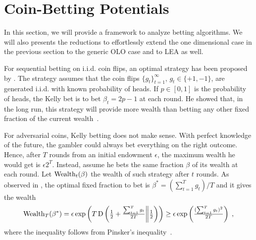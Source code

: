 \section{Coin-Betting Potentials}
\label{section:coin-betting-potentials}

In this section, we will provide a framework to analyze betting algorithms.  We
will also presents the reductions to effortlessly extend the one dimensional
case in the previous section to the generic \ac{OLO} case and to \ac{LEA} as
well.

For sequential betting on i.i.d. coin flips, an optimal strategy has been
proposed by \citet{Kelly-1956}.  The strategy assumes that the coin flips
$\{g_t\}_{t=1}^\infty$, $g_t \in \{+1,-1\}$, are generated i.i.d. with known
probability of heads. If $p \in [0,1]$ is the probability of heads, the Kelly
bet is to bet $\beta_t = 2p - 1$ at each round. He showed that, in the long
run, this strategy will provide more wealth than betting any other fixed
fraction of the current wealth~\cite{Kelly-1956}.

For adversarial coins, Kelly betting does not make sense. With perfect
knowledge of the future, the gambler could always bet everything on the right
outcome.  Hence, after $T$ rounds from an initial endowment $\epsilon$, the
maximum wealth he would get is $\epsilon 2^T$.  Instead, assume he bets the
same fraction $\beta$ of its wealth at each round.  Let $\operatorname{Wealth}_t(\beta)$ the
wealth of such strategy after $t$ rounds.  As observed in
\cite{McMahan-Abernethy-2013}, the optimal fixed fraction to bet is
$\beta^*=(\sum_{t=1}^T g_t)/T$ and it gives the wealth
\begin{equation}
\label{eq:opt_wealth}
\operatorname{Wealth}_T(\beta^*)
= \epsilon \exp\left(T \operatorname{D}\left({\tfrac{1}{2}+\tfrac{\sum_{t=1}^T g_t}{2T}}\middle\|{\tfrac{1}{2}}\right)\right)
\geq \epsilon \exp\left(\tfrac{(\sum_{t=1}^T g_t)^2}{2 T}\right) \; ,
\end{equation}
where the inequality follows from Pinsker's inequality~\citep[Lemma
11.6.1]{Cover-Thomas-2006}.


